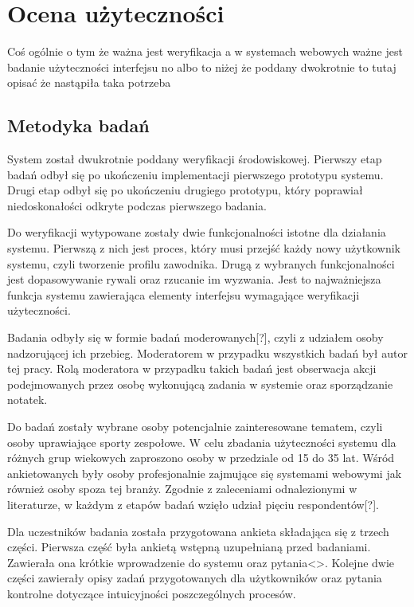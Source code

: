 \chapter{Ocena użyteczności}

Coś ogólnie o tym że ważna jest weryfikacja a w systemach webowych ważne jest badanie użyteczności interfejsu no albo to niżej że poddany dwokrotnie to tutaj opisać że nastąpiła taka potrzeba 

\section{Metodyka badań}

System został dwukrotnie poddany weryfikacji środowiskowej. Pierwszy etap badań odbył się po ukończeniu implementacji pierwszego prototypu systemu. Drugi etap odbył się po ukończeniu drugiego prototypu, który poprawiał niedoskonałości odkryte podczas pierwszego badania.

Do weryfikacji wytypowane zostały dwie funkcjonalności istotne dla działania systemu. Pierwszą z nich jest proces, który musi przejść każdy nowy użytkownik systemu, czyli tworzenie profilu zawodnika. Drugą z wybranych funkcjonalności jest dopasowywanie rywali oraz rzucanie im wyzwania. Jest to najważniejsza funkcja systemu zawierająca elementy interfejsu wymagające weryfikacji użyteczności.

Badania odbyły się w formie badań moderowanych[?], czyli z udziałem osoby nadzorującej ich przebieg. Moderatorem w przypadku wszystkich badań był autor tej pracy. Rolą moderatora w przypadku takich badań jest obserwacja akcji podejmowanych przez osobę wykonującą zadania w systemie oraz sporządzanie notatek.

Do badań zostały wybrane osoby potencjalnie zainteresowane tematem, czyli osoby uprawiające sporty zespołowe. W celu zbadania użyteczności systemu dla różnych grup wiekowych zaproszono osoby w przedziale od 15 do 35 lat. Wśród ankietowanych były osoby profesjonalnie zajmujące się systemami webowymi jak również osoby spoza tej branży. Zgodnie z zaleceniami odnalezionymi w literaturze, w każdym z etapów badań wzięło udział pięciu respondentów[?].

Dla uczestników badania została przygotowana ankieta składająca się z trzech części. Pierwsza część była ankietą wstępną uzupełnianą przed badaniami. Zawierała ona krótkie wprowadzenie do systemu oraz pytania<>. Kolejne dwie części zawierały opisy zadań przygotowanych dla użytkowników oraz pytania kontrolne dotyczące intuicyjności poszczególnych procesów. 

